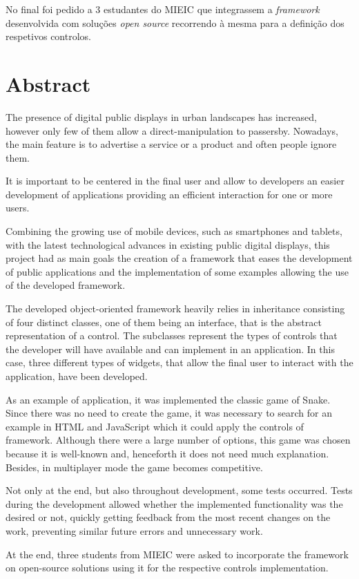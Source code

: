 No final foi pedido a 3 estudantes do MIEIC que integrassem a \textit{framework} desenvolvida com soluções \textit{open source} recorrendo à mesma para a definição dos respetivos controlos.


\chapter*{Abstract}

The presence of digital public displays in urban landscapes has increased, however only few of them allow a direct-manipulation to passersby. Nowadays, the main feature is to advertise a service or a product and often people ignore them. 

It is important to be centered in the final user and allow to developers an easier development of applications providing an efficient interaction for one or more users. 

Combining the growing use of mobile devices, such as smartphones and tablets, with the latest technological advances in existing public digital displays, this project had as main goals the creation of a framework that eases the development of public applications and the implementation of some examples allowing the use of the developed framework.

The developed object-oriented framework heavily relies in inheritance consisting of four distinct classes, one of them being an interface, that is the abstract representation of a control. The subclasses represent the types of controls that the developer will have available and can implement in an application. In this case, three different types of widgets, that allow the final user to interact with the application, have been developed.

As an example of application, it was implemented the classic game of Snake. Since there was no need to create the game, it was necessary to search for an example in HTML and JavaScript which it could apply the controls of framework. Although there were a large number of options, this game was chosen because it is well-known and, henceforth it does not need much explanation. Besides, in multiplayer mode the game becomes competitive.

Not only at the end, but also throughout development, some tests occurred. Tests during the development allowed whether the implemented functionality was the desired or not, quickly getting feedback from the most recent changes on the work, preventing similar future errors and unnecessary work.

At the end, three students from MIEIC were asked to incorporate the framework on open-source solutions using it for the respective controls implementation.
